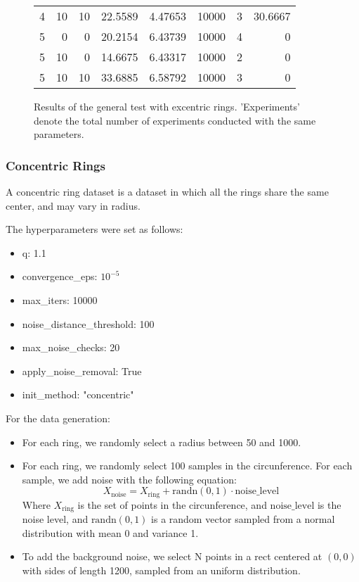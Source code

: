 \documentclass[conference]{IEEEtran}
\begin{document}
\begin{figure*}[!ht]
\begin{tabular}{rrrrrrrr}
                     4 &           10 &                 10 &     22.5589  &    4.47653     &   10000      &             3 &              30.6667  \\
                     5 &            0 &                  0 &     20.2154  &    6.43739     &   10000      &             4 &               0       \\
                     5 &           10 &                  0 &     14.6675  &    6.43317     &   10000      &             2 &               0       \\
                     5 &           10 &                 10 &     33.6885  &    6.58792     &   10000      &             3 &               0       \\
    \hline
\end{tabular}
\caption{Results of the general test with excentric rings. 'Experiments' denote the total number of experiments conducted with the same parameters.}
\end{figure*}

\subsubsection{Concentric Rings}
A concentric ring dataset is a dataset in which all the rings share the same center, and may vary in radius.

The hyperparameters were set as follows:

\begin{itemize}
    \item q: 1.1
    \item convergence\_eps: $10^{-5}$
    \item max\_iters: 10000
    \item noise\_distance\_threshold: 100
    \item max\_noise\_checks: 20
    \item apply\_noise\_removal: True
    \item init\_method: "concentric"
\end{itemize}

For the data generation:
\begin{itemize}
    \item For each ring, we randomly select a radius between 50 and 1000.
    \item For each ring, we randomly select 100 samples in the circunference. For each sample, we add noise with the following equation:
    \begin{equation}
        X_{\text{noise}} = X_{\text{ring}} + \text{randn}(0, 1) \cdot \text{noise\_level}
    \end{equation}
    Where $X_{\text{ring}}$ is the set of points in the circunference, and $\text{noise\_level}$ is the noise level, and $\text{randn}(0, 1)$ is a random vector sampled from a normal distribution with mean 0 and variance 1.
    \item To add the background noise, we select N points in a rect centered at $(0, 0)$ with sides of length 1200, sampled from an uniform distribution.
\end{itemize}
\end{document}
